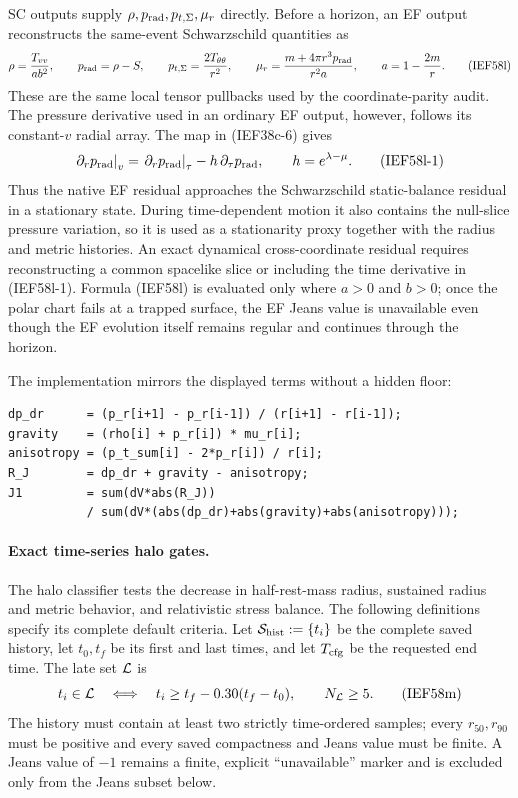 SC outputs supply \(\rho,p_{\rm rad},p_{t,\Sigma},\mu_r\) directly.  Before
a horizon,
an EF output reconstructs the same-event Schwarzschild quantities as
\begin{equation*}
 \rho=\frac{T_{vv}}{ab^2},\qquad
 p_{\rm rad}=\rho-S,\qquad
 p_{t,\Sigma}=\frac{2T_{\theta\theta}}{r^2},\qquad
 \mu_r=\frac{m+4\pi r^3p_{\rm rad}}{r^2a},
 \qquad a=1-\frac{2m}{r}.                                  \tag{IEF58l}
\end{equation*}
These are the same local tensor pullbacks used by the coordinate-parity
audit.  The pressure derivative used in an ordinary EF output, however,
follows its constant-\(v\) radial array.  The map in (IEF38c-6) gives
\[
 \left.\partial_rp_{\rm rad}\right|_v
 =\left.\partial_rp_{\rm rad}\right|_\tau
  -h\,\partial_\tau p_{\rm rad},\qquad
 h=e^{\lambda-\mu}.                                    \tag{IEF58l-1}
\]
Thus the native EF residual approaches the Schwarzschild static-balance
residual in a stationary state.  During time-dependent motion it also
contains the null-slice pressure variation, so it is used as a stationarity
proxy together with the radius and metric histories.  An exact dynamical
cross-coordinate residual requires reconstructing a common spacelike slice
or including the time derivative in (IEF58l-1).
Formula (IEF58l) is evaluated
only where \(a>0\) and \(b>0\); once the polar chart fails at a trapped surface,
the EF Jeans value is unavailable even though the EF evolution itself remains
regular and continues through the horizon.

The implementation mirrors the displayed terms without a hidden floor:
\begin{lstlisting}[basicstyle=\ttfamily\scriptsize]
dp_dr      = (p_r[i+1] - p_r[i-1]) / (r[i+1] - r[i-1]);
gravity    = (rho[i] + p_r[i]) * mu_r[i];
anisotropy = (p_t_sum[i] - 2*p_r[i]) / r[i];
R_J        = dp_dr + gravity - anisotropy;
J1         = sum(dV*abs(R_J))
           / sum(dV*(abs(dp_dr)+abs(gravity)+abs(anisotropy)));
\end{lstlisting}
\paragraph{Exact time-series halo gates.}
The halo classifier tests the decrease in half-rest-mass radius, sustained
radius and metric behavior, and relativistic stress balance.  The following definitions specify its
complete default criteria.  Let
\({\cal S}_{\rm hist}:=\{t_i\}\) be the complete
saved history, let \(t_0,t_f\) be its first and last times, and let
\(T_{\rm cfg}\) be the requested end time.  The late set \({\cal L}\) is
\[
 t_i\in{\cal L}
 \quad\Longleftrightarrow\quad
 t_i\ge t_f-0.30(t_f-t_0),
 \qquad N_{\cal L}\ge5.                                \tag{IEF58m}
\]
The history must contain at least two strictly time-ordered samples; every
\(r_{50},r_{90}\) must be positive and every saved compactness and Jeans
value must be finite.  A Jeans value of \(-1\) remains a finite, explicit
``unavailable'' marker and is excluded only from the Jeans subset below.

